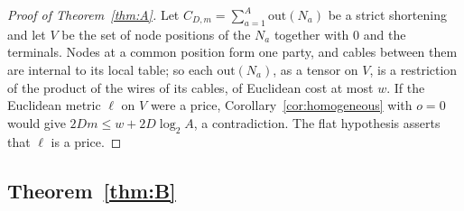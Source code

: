 \documentclass[11pt,a4paper]{article}
\theoremstyle{definition}
\begin{document}
\begin{proof}[Proof of Theorem~\ref{thm:A}]
Let $C_{D,m}=\sum_{a=1}^A\mathrm{out}(N_a)$ be a strict shortening and let $V$ be
the set of node positions of the $N_a$ together with $0$ and the terminals.
Nodes at a common position form one party, and cables between them are internal
to its local table; so each $\mathrm{out}(N_a)$, as a tensor on $V$, is a
restriction of the product of the wires of its cables, of Euclidean cost at
most $w$. If the Euclidean metric $\ell$ on $V$ were a price,
Corollary~\ref{cor:homogeneous} with $o=0$ would give
$2Dm\le w+2D\log_2A$, a contradiction. The flat hypothesis asserts that $\ell$ is
a price.
\end{proof}

\subsection{Theorem~\ref{thm:B}}
\end{document}
